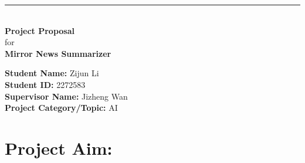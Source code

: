 \documentclass[a4paper]{article}
\begin{document}

\begin{titlepage}
	
	\rule{\linewidth}{5pt}
	\raggedleft
	\fontsize{38pt}{50pt}\selectfont
    \textbf{\\Project Proposal\\}
    \fontsize{28pt}{60pt}\selectfont 
    for\\
    \fontsize{38pt}{60pt}\selectfont 
    \textbf{Mirror News Summarizer\\}
	
	\vfill %
	
	
	\parbox[t]{0.93\textwidth}{ %
		\raggedleft %
		\large %
		{\bf Student Name:} Zijun Li\\
        {\bf Student ID:} 2272583\\
        {\bf Supervisor Name:} Jizheng Wan\\
        {\bf Project Category/Topic:} AI\\
	}
	
\end{titlepage}

\section{Project Aim:}
\end{document}
